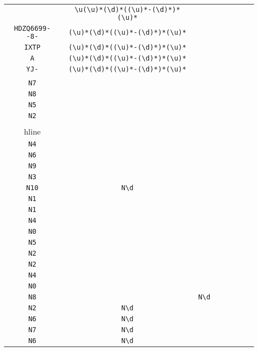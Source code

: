 \begin{longtable}{cccccccc}
\begin{tabular}{ll}
    \verb|KHZ| & \verb|\u(\u)*(\d)*((\u)*-(\d)*)*(\u)*|\\
\verb|HDZQ6699--8-| & \verb|(\u)*(\d)*((\u)*-(\d)*)*(\u)*|\\
\verb|IXTP| & \verb|(\u)*(\d)*((\u)*-(\d)*)*(\u)*|\\
\verb|A| & \verb|(\u)*(\d)*((\u)*-(\d)*)*(\u)*|\\
\verb|YJ-| & \verb|(\u)*(\d)*((\u)*-(\d)*)*(\u)*|
\end{tabular}
\\\midrule 
\begin{tabular}{l}
    \verb|N1|\\
\verb|N7|\\
\verb|N8|\\
\verb|N5|\\
\verb|N2|\\
\\hline\\
\verb|N4|\\
\verb|N6|\\
\verb|N9|\\
\verb|N3|\\
\verb|N10|
\end{tabular}

&
\verb|N\d|
&

\begin{tabular}{l}
    \verb|N\d|\\
\verb|N1|\\
\verb|N1|\\
\verb|N4|\\
\verb|N0|\\
\verb|N5|
\end{tabular}

&

\begin{tabular}{l}
    \verb|N\d|\\
\verb|N2|\\
\verb|N2|\\
\verb|N4|\\
\verb|N0|\\
\verb|N8|
\end{tabular}

&

\begin{tabular}{ll}
    \verb|N2| & \verb|N\d|\\
\verb|N2| & \verb|N\d|\\
\verb|N6| & \verb|N\d|\\
\verb|N7| & \verb|N\d|\\
\verb|N6| & \verb|N\d|
\end{tabular}


  \end{longtable}
